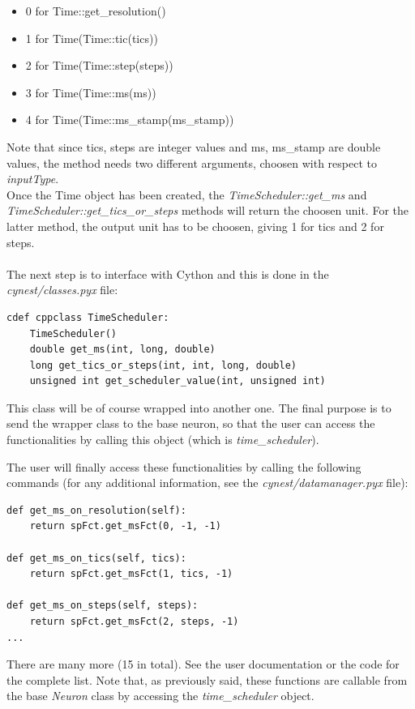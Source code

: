 \documentclass{article}
\begin{document}
\begin{itemize}
\item 0 for Time::get\_resolution()
\item 1 for Time(Time::tic(tics))
\item 2 for Time(Time::step(steps))
\item 3 for Time(Time::ms(ms))
\item 4 for Time(Time::ms\_stamp(ms\_stamp))
\end{itemize}
Note that since tics, steps are integer values and ms, ms\_stamp are double values, the method needs two different arguments, choosen with respect to \emph{inputType}.\\
Once the Time object has been created, the \emph{TimeScheduler::get\_ms} and \emph{TimeScheduler::get\_tics\_or\_steps} methods will return the choosen unit.
For the latter method, the output unit has to be choosen, giving 1 for tics and 2 for steps.\\ \\
The next step is to interface with Cython and this is done in the \emph{cynest/classes.pyx} file:
\begin{verbatim}
cdef cppclass TimeScheduler:
    TimeScheduler()
    double get_ms(int, long, double)
    long get_tics_or_steps(int, int, long, double)
    unsigned int get_scheduler_value(int, unsigned int)
\end{verbatim}
This class will be of course wrapped into another one. The final purpose is to send the wrapper class to the base neuron, so that the user can access the functionalities by calling this object (which is \emph{time\_scheduler}).


The user will finally access these functionalities by calling the following commands (for any additional information, see the \emph{cynest/datamanager.pyx} file):
\begin{verbatim}
def get_ms_on_resolution(self):
    return spFct.get_msFct(0, -1, -1)

def get_ms_on_tics(self, tics):
    return spFct.get_msFct(1, tics, -1)

def get_ms_on_steps(self, steps):
    return spFct.get_msFct(2, steps, -1)
...
\end{verbatim}
There are many more (15 in total). See the user documentation or the code for the complete list.
Note that, as previously said, these functions are callable from the base \emph{Neuron} class by accessing the \emph{time\_scheduler} object.
\end{document}
